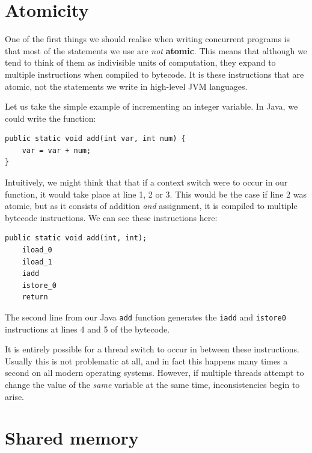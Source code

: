\documentclass[a4paper,12pt]{kth-mag}
\begin{document}
\section{Atomicity}

One of the first things we should realise when writing concurrent programs is that most of the statements we use are \textit{not} \textbf{atomic}. This means that although we tend to think of them as indivisible units of computation, they expand to multiple instructions when compiled to bytecode. It is these instructions that are atomic, not the statements we write in high-level JVM languages.

Let us take the simple example of incrementing an integer variable. In Java, we could write the function:

\begin{listing}[H]
\begin{verbatim}
public static void add(int var, int num) { 
	var = var + num; 
}
\end{verbatim}
\end{listing}

Intuitively, we might think that that if a context switch were to occur in our function, it would take place at line 1, 2 or 3. This would be the case if line 2 was atomic, but as it consists of addition \textit{and} assignment, it is compiled to multiple bytecode instructions. We can see these instructions here:

\begin{listing}[H]
	\begin{verbatim}
public static void add(int, int);
	iload_0
	iload_1
	iadd
	istore_0
	return
  	\end{verbatim}
\end{listing}

The second line from our Java \texttt{add} function generates the \texttt{iadd} and \texttt{istore0} instructions at lines 4 and 5 of the bytecode. 

It is entirely possible for a thread switch to occur in between these instructions. Usually this is not problematic at all, and in fact this happens many times a second on all modern operating systems. However, if multiple threads attempt to change the value of the \textit{same} variable at the same time, inconsistencies begin to arise. 

\section{Shared memory}
\end{document}
